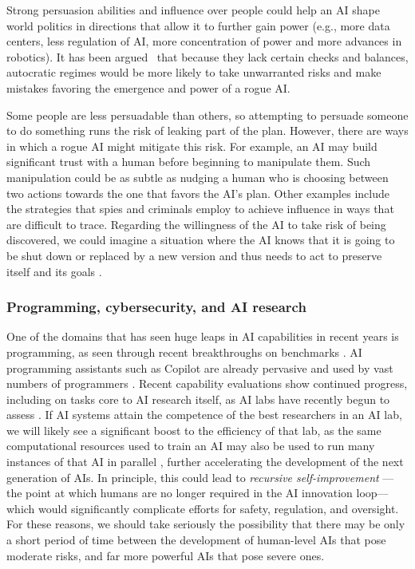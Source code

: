 Strong persuasion abilities and influence over people could help an AI shape world politics in directions that allow it to further gain power (e.g., more data centers, less regulation of AI, more concentration of power and more advances in robotics). It has been argued~\cite{bengio2023ai} that because they lack certain checks and balances, autocratic regimes would be more likely to take unwarranted risks and make mistakes favoring the emergence and power of a rogue AI. 

Some people are less persuadable than others, so attempting to persuade someone to do something runs the risk of leaking part of the plan. However, there are ways in which a rogue AI might mitigate this risk. For example, an AI may build significant trust with a human before beginning to manipulate them. Such manipulation could be as subtle as nudging a human who is choosing between two actions towards the one that favors the AI’s plan. Other examples include the strategies that spies and criminals employ to achieve influence in ways that are difficult to trace. Regarding the willingness of the AI to take risk of being discovered, we could imagine a situation where the AI knows that it is going to be shut down or replaced by a new version and thus needs to act to preserve itself and its goals \cite{arxiv.org.abs.2412.04984,arxiv.org.abs.2412.14093}.

    \subsubsection{Programming, cybersecurity, and AI research}
    \label{sec:existential:lossofcontrol:progr-cybersec-airesearch}

One of the domains that has seen huge leaps in AI capabilities in recent years is programming, as seen through recent breakthroughs on benchmarks \cite{openreview.net.forum.id.VTF8yNQM66}. AI programming assistants such as Copilot are already pervasive and used by vast numbers of programmers \cite{www.microsoft.com.en.us.investor.events.fy.2024.earnings.fy.2024.q1}. Recent capability evaluations \cite{arxiv.org.abs.2411.15114,assets.anthropic.com.m.61e7d27f8c8f5919.original.Claude.3.Model.Card.pdf,openai.com.index.openai.o1.system.card} show continued progress, including on tasks core to AI research itself, as AI labs have recently begun to assess \cite{openai.com.index.mle.bench}. If AI systems attain the competence of the best researchers in an AI lab, we will likely see a significant boost to the efficiency of that lab, as the same computational resources used to train an AI may also be used to run many instances of that AI in parallel \cite{darioamodei.com.machines.of.loving.grace}, further accelerating the development of the next generation of AIs. 
In principle, this could lead to \textit{recursive self-improvement} \cite{www.sciencedirect.com.science.article.abs.pii.S0065245808604180}---the point at which humans are no longer required in the AI innovation loop---which would significantly complicate efforts for safety, regulation, and oversight. For these reasons, we should take seriously the possibility that there may be only a short period of time between the development of human-level AIs that pose moderate risks, and far more powerful AIs that pose severe ones.

